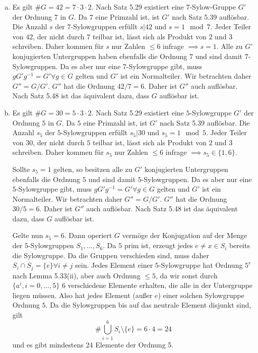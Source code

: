 \documentclass{article}
\begin{document}
\begin{enumerate}[(a)]
    \item Es gilt $\# G = 42 = 7 \cdot 3 \cdot 2$. Nach Satz 5.29 existiert eine $7$-Sylow-Gruppe $G'$ der Ordnung $7$ in $G$.
    Da $7$ eine Primzahl ist, ist $G'$ nach Satz 5.39 auflösbar. 
    Die Anzahl $s$ der $7$-Sylowgruppen erfüllt $s | 42$ und $s = 1 \mod 7$.
    Jeder Teiler von $42$, der nicht durch 7 teilbar ist, lässt sich als Produkt von $2$ und $3$ schreiben.
    Daher kommen für $s$ nur Zahlen $\leq 6$ infrage $\implies s = 1$.
    Alle zu $G'$ konjugierten Untergruppen haben ebenfalls die Ordnung $7$ und sind damit $7$-Sylowgruppen.
    Da es aber nur eine $7$-Sylowgruppe gibt, muss $gG'g^{-1} = G' \forall g \in G$ gelten und $G'$ ist ein Normalteiler.
    Wir betrachten daher $G'' = G/G'$. $G''$ hat die Ordnung $42/7 = 6$. Daher ist $G''$ auch auflösbar.
    Nach Satz 5.48 ist das äquivalent dazu, dass $G$ auflösbar ist.
    \item Es gilt $\# G = 30 = 5 \cdot 3 \cdot 2$. Nach Satz 5.29 existiert eine $5$-Sylowgruppe $G'$ der Ordnung $5$ in $G$.
    Da $5$ eine Primzahl ist, ist $G'$ nach Satz 5.39 auflösbar. 
    Die Anzahl $s_5$ der $5$-Sylowgruppen erfüllt $s_5 | 30$ und $s_5 = 1 \mod 5$.
    Jeder Teiler von $30$, der nicht durch $5$ teilbar ist, lässt sich als Produkt von $2$ und $3$ schreiben.
    Daher kommen für $s_5$ nur Zahlen $\leq 6$ infrage $\implies s_5 \in \{1, 6\}$.

    Sollte $s_5 = 1$ gelten, so besitzen alle zu $G'$ konjugierten Untergruppen ebenfalls die Ordnung $5$ und sind
    damit $5$-Sylowgruppen.
    Da es aber nur eine $5$-Sylowgruppe gibt, muss $gG'g^{-1} = G' \forall g \in G$ gelten und $G'$ ist ein Normalteiler.
    Wir betrachten daher $G'' = G/G'$. $G''$ hat die Ordnung $30/5 = 6$. Daher ist $G''$ auch auflösbar.
    Nach Satz 5.48 ist das äquivalent dazu, dass $G$ auflösbar ist.

    Gelte nun $s_5 = 6$. Dann operiert $G$ vermöge der Konjugation auf der Menge der $5$-Sylowgruppen $S_1, \dots, S_6$.
    Da $5$ prim ist, erzeugt jedes $e \neq x \in S_i$ bereits die Sylowgruppe.
    Da die Gruppen verschieden sind, muss daher $S_i \cap S_j = \{e\} \forall i \neq j$ sein.
    Jedes Element einer $5$-Sylowgruppe hat Ordnung $5^r$ nach Lemma 5.33(ii), aber auch Ordnung $\leq 5$,
    da wir sonst durch $\{a^i, i = 0, \dots, 5\}$ 6 verschiedene Elemente erhalten, die alle in der Untergruppe liegen müssen.
    Also hat jedes Element (außer $e$) einer solchen Sylowgruppe Ordnung $5$.
    Da die Sylowgruppen bis auf das neutrale Element disjunkt sind, gilt
    \[
         \# \bigcup_{i = 1}^6 S_i \setminus \{e\} = 6 \cdot 4 = 24  
    \]
    und es gibt mindestens 24 Elemente der Ordnung 5.


\end{enumerate}
\end{document}
